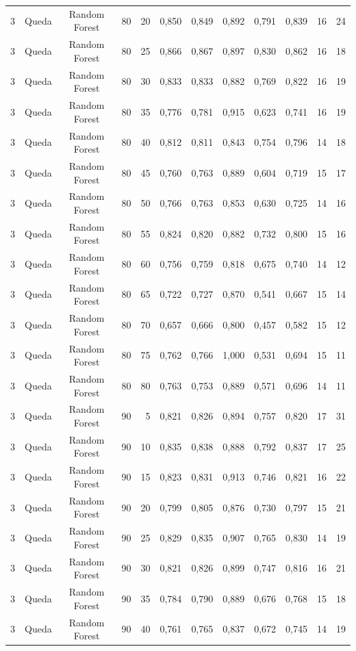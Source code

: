 \begin{longtable}{ccclrrrrrrrr}
3 & Queda & Random Forest & 80 & 20 & 0,850 & 0,849 & 0,892 & 0,791 & 0,839 & 16 & 24 \\
3 & Queda & Random Forest & 80 & 25 & 0,866 & 0,867 & 0,897 & 0,830 & 0,862 & 16 & 18 \\
3 & Queda & Random Forest & 80 & 30 & 0,833 & 0,833 & 0,882 & 0,769 & 0,822 & 16 & 19 \\
3 & Queda & Random Forest & 80 & 35 & 0,776 & 0,781 & 0,915 & 0,623 & 0,741 & 16 & 19 \\
3 & Queda & Random Forest & 80 & 40 & 0,812 & 0,811 & 0,843 & 0,754 & 0,796 & 14 & 18 \\
3 & Queda & Random Forest & 80 & 45 & 0,760 & 0,763 & 0,889 & 0,604 & 0,719 & 15 & 17 \\
3 & Queda & Random Forest & 80 & 50 & 0,766 & 0,763 & 0,853 & 0,630 & 0,725 & 14 & 16 \\
3 & Queda & Random Forest & 80 & 55 & 0,824 & 0,820 & 0,882 & 0,732 & 0,800 & 15 & 16 \\
3 & Queda & Random Forest & 80 & 60 & 0,756 & 0,759 & 0,818 & 0,675 & 0,740 & 14 & 12 \\
3 & Queda & Random Forest & 80 & 65 & 0,722 & 0,727 & 0,870 & 0,541 & 0,667 & 15 & 14 \\
3 & Queda & Random Forest & 80 & 70 & 0,657 & 0,666 & 0,800 & 0,457 & 0,582 & 15 & 12 \\
3 & Queda & Random Forest & 80 & 75 & 0,762 & 0,766 & 1,000 & 0,531 & 0,694 & 15 & 11 \\
3 & Queda & Random Forest & 80 & 80 & 0,763 & 0,753 & 0,889 & 0,571 & 0,696 & 14 & 11 \\
3 & Queda & Random Forest & 90 & 5 & 0,821 & 0,826 & 0,894 & 0,757 & 0,820 & 17 & 31 \\
3 & Queda & Random Forest & 90 & 10 & 0,835 & 0,838 & 0,888 & 0,792 & 0,837 & 17 & 25 \\
3 & Queda & Random Forest & 90 & 15 & 0,823 & 0,831 & 0,913 & 0,746 & 0,821 & 16 & 22 \\
3 & Queda & Random Forest & 90 & 20 & 0,799 & 0,805 & 0,876 & 0,730 & 0,797 & 15 & 21 \\
3 & Queda & Random Forest & 90 & 25 & 0,829 & 0,835 & 0,907 & 0,765 & 0,830 & 14 & 19 \\
3 & Queda & Random Forest & 90 & 30 & 0,821 & 0,826 & 0,899 & 0,747 & 0,816 & 16 & 21 \\
3 & Queda & Random Forest & 90 & 35 & 0,784 & 0,790 & 0,889 & 0,676 & 0,768 & 15 & 18 \\
3 & Queda & Random Forest & 90 & 40 & 0,761 & 0,765 & 0,837 & 0,672 & 0,745 & 14 & 19 \\

\end{longtable}
